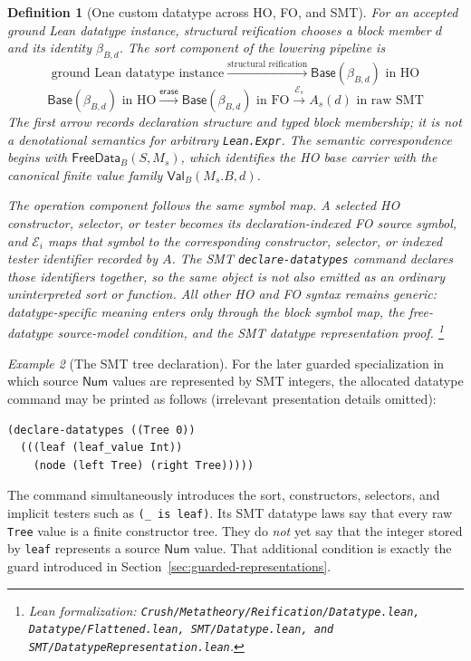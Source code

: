 \documentclass[11pt]{article}
\newtheorem{definition}{Definition}[section]
\theoremstyle{remark}
\newtheorem{example}[definition]{Example}
\newcommand{\leanfiles}[1]{\footnote{Lean formalization: \texttt{Crush/Metatheory/#1}.}}
\newcommand{\Base}{\mathsf{Base}}
\newcommand{\FreeDataModel}{\mathsf{FreeData}}
\newcommand{\Val}{\mathsf{Val}}
\newcommand{\dsort}[2]{\beta_{#1,#2}}
\newcommand{\Num}{\mathsf{Num}}
\begin{document}
\begin{definition}[One custom datatype across HO, FO, and SMT]
For an accepted ground Lean datatype instance, structural reification chooses
a block member $d$ and its identity $\dsort{B}{d}$. The sort component of the
lowering pipeline is
\[
 \boxed{\text{ground Lean datatype instance}}
 \xrightarrow{\text{structural reification}}
 \boxed{\Base(\dsort{B}{d})\text{ in HO}}
\]
\[
 \boxed{\Base(\dsort{B}{d})\text{ in HO}}
 \xrightarrow{\mathsf{erase}}
 \boxed{\Base(\dsort{B}{d})\text{ in FO}}
 \xrightarrow{\mathcal E_s}
 \boxed{A_s(d)\text{ in raw SMT}}
\]
The first arrow records declaration structure and typed block membership; it is not a
denotational semantics for arbitrary \texttt{Lean.Expr}. The semantic correspondence
begins with $\FreeDataModel_B(S,M_s)$, which identifies the HO base carrier with the
canonical finite value family $\Val_B(M_s.B,d)$.

The operation component follows the same symbol map. A selected HO constructor,
selector, or tester becomes its declaration-indexed FO source symbol, and
$\mathcal E_i$ maps that symbol to the corresponding constructor, selector, or
indexed tester identifier recorded by $A$. The SMT
\texttt{declare-datatypes} command declares those identifiers together, so the
same object is not also emitted as an ordinary uninterpreted sort or function.
All other HO and FO syntax remains generic: datatype-specific meaning enters
only through the block symbol map, the free-datatype source-model condition,
and the SMT datatype representation proof.
\leanfiles{Reification/Datatype.lean, Datatype/Flattened.lean, SMT/Datatype.lean, and SMT/DatatypeRepresentation.lean}
\end{definition}

\begin{example}[The SMT tree declaration]
For the later guarded specialization in which source $\Num$ values are
represented by SMT integers, the allocated datatype command may be printed as
follows (irrelevant presentation details omitted):
\begin{verbatim}
(declare-datatypes ((Tree 0))
  (((leaf (leaf_value Int))
    (node (left Tree) (right Tree)))))
\end{verbatim}
The command simultaneously introduces the sort, constructors, selectors, and
implicit testers such as \texttt{(\_ is leaf)}. Its SMT datatype laws say
that every raw \texttt{Tree} value is a finite constructor tree. They do
\emph{not} yet say that the integer stored by \texttt{leaf} represents a source
$\Num$ value. That additional condition is exactly the guard introduced in
Section~\ref{sec:guarded-representations}.
\end{example}
\end{document}
